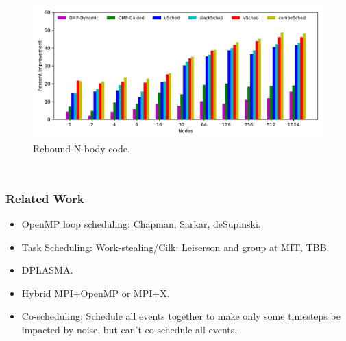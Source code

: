 {\begin{frame}[label=perfComp]
\begin{columns}
\begin{figure}[ht]
\begin{center} 
\includegraphics[scale=0.18]{./plots/app-scaling-strat-nbody-fastNUMA2}\\
\vspace*{-0.16in}
{\tiny Rebound N-body code.}
\end{center}
\end{figure} 
\end{columns} 
\end{frame}

\begin{frame}[label=relatedWork]
\frametitle{Related Work}
\begin{itemize}
\small \item \small OpenMP loop scheduling: Chapman, Sarkar, deSupinski.
\item \small Task Scheduling:  Work-stealing/Cilk: Leiserson and group at MIT, TBB. 
\item \small DPLASMA. 
\item \small Hybrid MPI+OpenMP or MPI+X. 
\item \small Co-scheduling: Schedule all events together to make only some timesteps be impacted by noise, but can't co-schedule all events.
\end{itemize}
\end{frame}  

}
